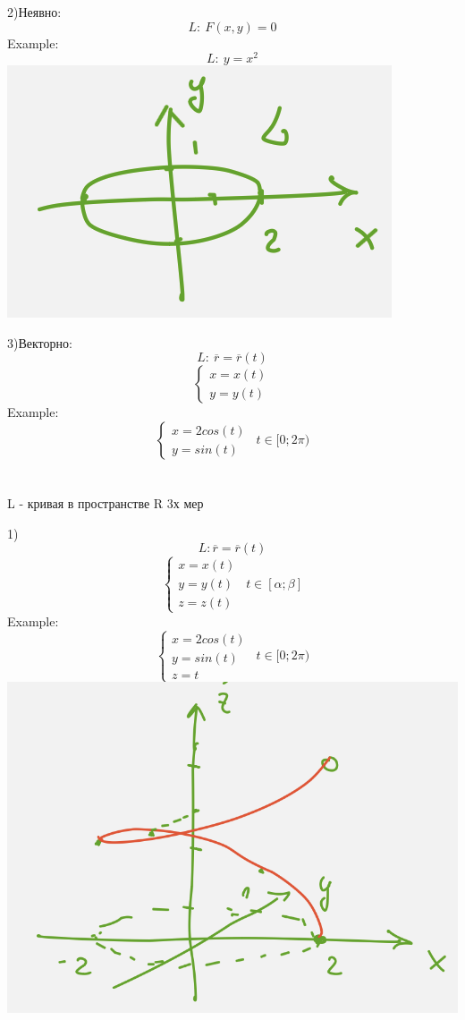 \documentclass{article}
\begin{document}
2)Неявно:
\begin{equation*}
    L:\ F(x,y) = 0
\end{equation*}
Example:
\begin{equation*}
    L:\ y=x^2
\end{equation*}
\includegraphics[width=.3\textwidth]{neyavno.png} 

3)Векторно:
\begin{equation*}
    L:\ \overline{r} = \overline{r}(t)
\end{equation*}
\begin{equation*}
    \begin{cases}
        x = x(t)\\
        y = y(t)
    \end{cases}
\end{equation*}
Example:
\begin{equation*}
    \begin{cases}
        x = 2cos(t)\\
        y = sin(t)
    \end{cases}
    \ \ t\in [0;2\pi)
\end{equation*}
\\ \\
L - кривая в пространстве R 3х мер

1)
\begin{equation*}
    L: \overline{r} = \overline{r}(t)
\end{equation*}
\begin{equation*}
    \begin{cases}
        x = x(t)\\
        y=y(t)\\
        z=z(t)
    \end{cases}
    \ \ t\in [\alpha;\beta]
\end{equation*}
Example:
\begin{equation*}
    \begin{cases}
        x = 2cos(t)\\
        y=sin(t)\\
        z=t
    \end{cases}
    \ \ t\in [0;2\pi)
\end{equation*}
\includegraphics[width=.3\textwidth]{spiral.png} 
\end{document}
